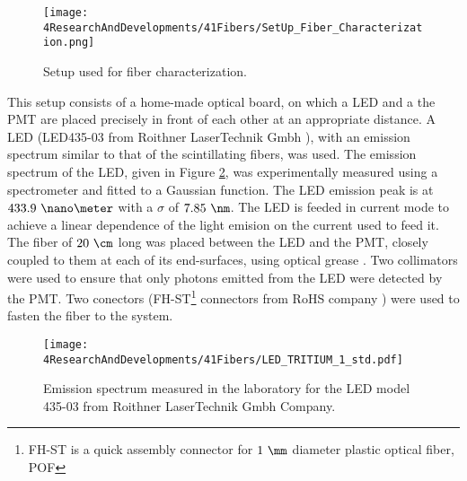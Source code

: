 \begin{figure}[h]
\centering
\texttt{[image: 4ResearchAndDevelopments/41Fibers/SetUp\_Fiber\_Characterization.png]}
\caption{Setup used for fiber characterization.\label{fig:SetUpFiberCharacterization}}
\end{figure}

This setup consists of a home-made optical board, on which a LED and a the PMT are placed precisely in front of each other at an appropriate distance. A LED (LED435-03 from Roithner LaserTechnik Gmbh \cite{LEDRLT}), with an emission spectrum similar to that of the scintillating fibers, was used. The emission spectrum of the LED, given in Figure \ref{fig:LEDSpectrumTritium}, was experimentally measured using a spectrometer and fitted to a Gaussian function. The LED emission peak is at $433.9~\nano\meter$ with a $\sigma$ of $7.85~\nm$. The LED is feeded in current mode to achieve a linear dependence of the light emision on the current used to feed it. The fiber of $20~\cm$ long was placed between the LED and the PMT, closely coupled to them at each of its end-surfaces, using optical grease \cite{OpticalGrease}. Two collimators were used to ensure that only photons emitted from the LED were detected by the PMT. Two conectors (FH-ST\footnote{FH-ST is a quick assembly connector for $1~\mm$ diameter plastic optical fiber, POF} connectors from RoHS company \cite{}) were used to fasten the fiber to the system. 

\begin{figure}[h]
\centering
\texttt{[image: 4ResearchAndDevelopments/41Fibers/LED\_TRITIUM\_1\_std.pdf]}
\caption{Emission spectrum measured in the laboratory for the LED model 435-03 from Roithner LaserTechnik Gmbh Company.\label{fig:LEDSpectrumTritium}}
\end{figure}